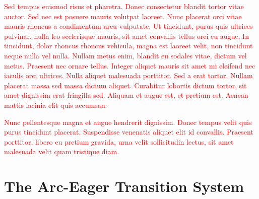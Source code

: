 \documentclass[11pt,letterpaper]{article}
\newcommand{\note}[1]{\textcolor{red}{#1}}
\begin{document}
\note{Sed tempus euismod risus et pharetra. Donec consectetur blandit tortor vitae auctor. Sed nec est posuere mauris volutpat laoreet. Nunc placerat orci vitae mauris rhoncus a condimentum arcu vulputate. Ut tincidunt, purus quis ultrices pulvinar, nulla leo scelerisque mauris, sit amet convallis tellus orci eu augue. In tincidunt, dolor rhoncus rhoncus vehicula, magna est laoreet velit, non tincidunt neque nulla vel nulla. Nullam metus enim, blandit eu sodales vitae, dictum vel metus. Praesent nec ornare tellus. Integer aliquet mauris sit amet mi eleifend nec iaculis orci ultrices. Nulla aliquet malesuada porttitor. Sed a erat tortor. Nullam placerat massa sed massa dictum aliquet. Curabitur lobortis dictum tortor, sit amet dignissim erat fringilla sed. Aliquam et augue est, et pretium est. Aenean mattis lacinia elit quis accumsan.}

\note{Nunc pellentesque magna et augue hendrerit dignissim. Donec tempus velit quis purus tincidunt placerat. Suspendisse venenatis aliquet elit id convallis. Praesent porttitor, libero eu pretium gravida, urna velit sollicitudin lectus, sit amet malesuada velit quam tristique diam.}



\section{The Arc-Eager Transition System}
\end{document}
